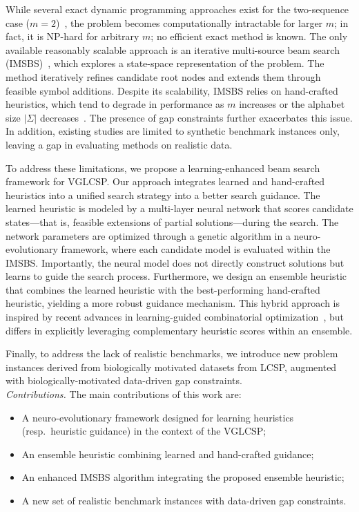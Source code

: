 \documentclass[runningheads]{llncs}
\begin{document}
While several exact dynamic programming approaches exist for the two-sequence case ($m=2$)~\cite{peng2014finding}, the problem becomes computationally intractable for larger $m$; in fact, it is NP-hard for arbitrary $m$; no efficient exact method is known. The only available reasonably scalable approach is an iterative multi-source beam search (IMSBS)~\cite{djukanovic2026_eurocast}, which explores a state-space representation of the problem. The method iteratively refines candidate root nodes and extends them through feasible symbol additions. Despite its scalability, IMSBS relies on hand-crafted heuristics, which tend to degrade in performance as $m$ increases or the alphabet size $|\Sigma|$ decreases~\cite{DJUKANOVIC2020106499}. The presence of gap constraints further exacerbates this issue.  In addition, existing studies are limited to synthetic benchmark instances only, leaving a gap in evaluating methods on realistic data.

To address these limitations, we propose a learning-enhanced beam search framework for VGLCSP. Our approach integrates learned and hand-crafted heuristics into a unified search strategy into a better search guidance. The learned heuristic is modeled by a multi-layer neural network that scores candidate states---that is, feasible extensions of partial solutions---during the search. The network parameters are optimized through a genetic algorithm in a neuro-evolutionary framework, where each candidate model is evaluated within the IMSBS. Importantly, the neural model does not directly construct solutions but learns to guide the search process. Furthermore, we design an ensemble heuristic that combines the learned heuristic with the best-performing hand-crafted heuristic, yielding a more robust guidance mechanism. This hybrid approach is inspired by recent advances in learning-guided combinatorial optimization~\cite{djukanovic2025learning,reixach2024neural,wu2021learning}, but differs in explicitly leveraging complementary heuristic scores within an ensemble.

Finally, to address the lack of realistic benchmarks, we introduce new problem instances derived from biologically motivated datasets from LCSP, augmented with biologically-motivated data-driven gap constraints.\\


\noindent\textit{Contributions.} The main contributions of this work are:
\begin{itemize}
	\item A neuro-evolutionary framework designed for learning heuristics (resp.~heuristic guidance) in the context of the VGLCSP;
	\item An ensemble heuristic combining learned and hand-crafted guidance;
	\item An enhanced IMSBS algorithm integrating the proposed ensemble heuristic;
	\item A new set of realistic benchmark instances with data-driven gap constraints.
\end{itemize}
\end{document}
